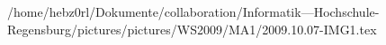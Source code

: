/home/hebz0rl/Dokumente/collaboration/Informatik---Hochschule-Regensburg/pictures/pictures/WS2009/MA1/2009.10.07-IMG1.tex